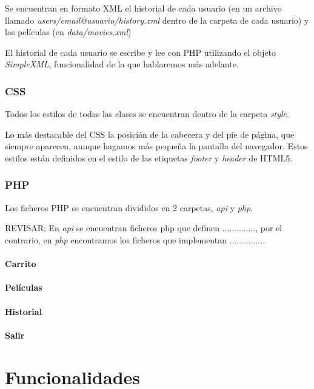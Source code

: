 \documentclass{apuntes}
\begin{document}
Se encuentran en formato XML el historial de cada usuario (en un archivo llamado \textit{users/email@usuario/history.xml} dentro de la carpeta de cada usuario) y las películas (en \textit{data/movies.xml})


El historial de cada usuario se escribe y lee con PHP utilizando el objeto \textit{SimpleXML}, funcionalidad de la que hablaremos más adelante.



\subsubsection{CSS}

Todos los estilos de todas las clases se encuentran dentro de la carpeta \textit{style}.

Lo más destacable del CSS la posición de la cabecera y del pie de página, que siempre aparecen, aunque hagamos más pequeña la pantalla del navegador. Estos estilos están definidos en el estilo de las etiquetas \textit{footer} y \textit{header} de HTML5.

\subsubsection{PHP}

Los ficheros PHP se encuentran divididos en 2 carpetas, \textit{api} y \textit{php}. 

\label{CriterioPHP}
REVISAR: En \textit{api} se encuentran ficheros php que definen .............., por el contrario, en \textit{php} encontramos los ficheros que implementan ...............

\paragraph{Carrito}

\paragraph{Películas}

\paragraph{Historial}

\paragraph{Salir}


\section{Funcionalidades}
\end{document}
